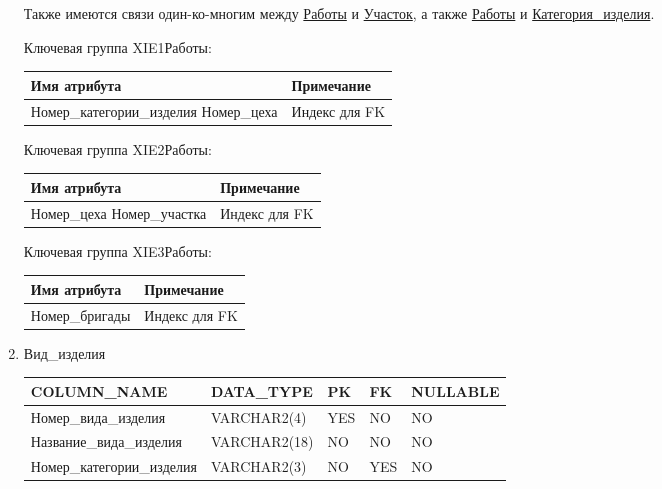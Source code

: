 \begin{enumerate}
    Также имеются связи один-ко-многим между \underline{Работы} и \underline{Участок}, а также \underline{Работы} и \underline{Категория\_изделия}.

    Ключевая группа XIE1Работы:

    \begin{tabular}{|p{7cm}|p{9.3cm}|} \hline

        {\bf Имя атрибута} & {\bf Примечание} \\ \hline
        Номер\_категории\_изделия \newline Номер\_цеха & Индекс для FK \\ \hline

    \end{tabular}

    Ключевая группа XIE2Работы:

    \begin{tabular}{|p{7cm}|p{9.3cm}|} \hline

        {\bf Имя атрибута} & {\bf Примечание} \\ \hline
        Номер\_цеха \newline Номер\_участка & Индекс для FK \\ \hline

    \end{tabular}

    Ключевая группа XIE3Работы:

    \begin{tabular}{|p{7cm}|p{9.3cm}|} \hline

        {\bf Имя атрибута} & {\bf Примечание} \\ \hline
        Номер\_бригады & Индекс для FK \\ \hline

    \end{tabular}

    \item{Вид\_изделия}

    \begin{tabular}{|p{7cm}|p{3cm}|p{1cm}|p{1cm}|p{3cm}|} \hline

        {\bf COLUMN\_NAME} & {\bf DATA\_TYPE} & {\bf PK} & {\bf FK} & {\bf NULLABLE} \\ \hline
        Номер\_вида\_изделия & VARCHAR2(4) & YES & NO & NO \\ \hline
        Название\_вида\_изделия & VARCHAR2(18) & NO & NO & NO \\ \hline
        Номер\_категории\_изделия & VARCHAR2(3) & NO & YES & NO \\ \hline


\end{tabular}
\end{enumerate}
